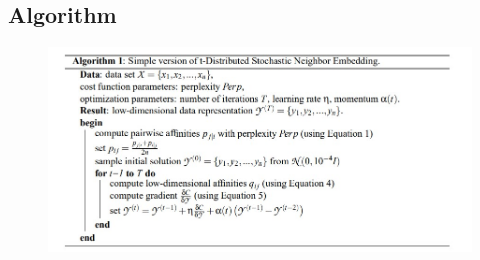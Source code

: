 \documentclass[12pt,letterpaper, onecolumn]{exam}
\begin{document}
\subsection*{Algorithm}
\begin{figure}[!h]
\centering
\includegraphics[width = \textwidth]{../images/tsne_alg}
\end{figure}
\end{document}
